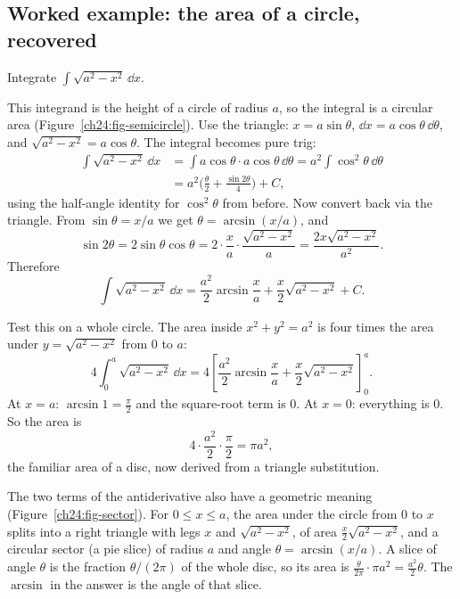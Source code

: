 \subsection{Worked example: the area of a circle, recovered}

\begin{example}[Root of $a^2 - x^2$]
\label{ch24:ex-circle}
Integrate $\displaystyle \int \sqrt{a^2 - x^2}\,\dd x.$
\end{example}

This integrand is the height of a circle of radius $a$, so the integral is a
circular area (Figure~\ref{ch24:fig-semicircle}). Use the triangle:
$x = a\sin\theta$, $\dd x = a\cos\theta\,\dd\theta$, and
$\sqrt{a^2-x^2} = a\cos\theta$. The integral becomes pure trig:
\begin{align*}
\int \sqrt{a^2-x^2}\,\dd x
&= \int a\cos\theta\cdot a\cos\theta\,\dd\theta
= a^2\int \cos^2\theta\,\dd\theta\\
&= a^2\Big(\frac{\theta}{2} + \frac{\sin 2\theta}{4}\Big) + C,
\end{align*}
using the half-angle identity for $\cos^2\theta$ from before. Now convert back
via the triangle. From $\sin\theta = x/a$ we get $\theta = \arcsin(x/a)$, and
\[
\sin 2\theta = 2\sin\theta\cos\theta
= 2\cdot\frac{x}{a}\cdot\frac{\sqrt{a^2-x^2}}{a}
= \frac{2x\sqrt{a^2-x^2}}{a^2}.
\]
Therefore
\[
\int \sqrt{a^2-x^2}\,\dd x
= \frac{a^2}{2}\arcsin\!\frac{x}{a} + \frac{x}{2}\sqrt{a^2 - x^2} + C.
\]

\begin{aestheticbox}
Test this on a whole circle. The area inside $x^2 + y^2 = a^2$ is four times
the area under $y = \sqrt{a^2 - x^2}$ from $0$ to $a$:
\[
4\int_0^a \sqrt{a^2 - x^2}\,\dd x
= 4\left[\frac{a^2}{2}\arcsin\!\frac{x}{a} + \frac{x}{2}\sqrt{a^2-x^2}
\right]_0^a.
\]
At $x = a$: $\arcsin 1 = \tfrac{\pi}{2}$ and the square-root term is $0$. At
$x = 0$: everything is $0$. So the area is
\[
4\cdot\frac{a^2}{2}\cdot\frac{\pi}{2} = \pi a^2,
\]
the familiar area of a disc, now derived from a triangle substitution.

The two terms of the antiderivative also have a geometric meaning
(Figure~\ref{ch24:fig-sector}). For $0 \le x \le a$, the area under the circle
from $0$ to $x$ splits into a right triangle with legs $x$ and
$\sqrt{a^2-x^2}$, of area $\tfrac{x}{2}\sqrt{a^2-x^2}$, and a circular sector
(a pie slice) of radius $a$ and angle $\theta = \arcsin(x/a)$. A slice of angle
$\theta$ is the fraction $\theta/(2\pi)$ of the whole disc, so its area is
$\tfrac{\theta}{2\pi}\cdot\pi a^2 = \tfrac{a^2}{2}\theta$. The $\arcsin$ in the
answer is the angle of that slice.
\end{aestheticbox}

